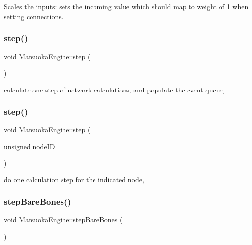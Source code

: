 Scales the inputs\+: sets the incoming value which should map to weight of 1 when setting connections. 

\mbox{\label{classMatsuokaEngine_a4fa468dc0814f1ad92594f7a4d5abd00}} 
\subsubsection{\texorpdfstring{step()}{step()}\hspace{0.1cm}{\footnotesize\ttfamily [1/2]}}
{\footnotesize\ttfamily void Matsuoka\+Engine\+::step (\begin{DoxyParamCaption}{ }\end{DoxyParamCaption})}



calculate one step of network calculations, and populate the event queue, 

\mbox{\label{classMatsuokaEngine_aedf2583d11befa98a8a9d74c700635d6}} 
\subsubsection{\texorpdfstring{step()}{step()}\hspace{0.1cm}{\footnotesize\ttfamily [2/2]}}
{\footnotesize\ttfamily void Matsuoka\+Engine\+::step (\begin{DoxyParamCaption}\item[{unsigned}]{node\+ID }\end{DoxyParamCaption})}



do one calculation step for the indicated node, 

\mbox{\label{classMatsuokaEngine_a12519e69a1b16fe9c07717ded5249cdf}} 
\subsubsection{\texorpdfstring{step\+Bare\+Bones()}{stepBareBones()}}
{\footnotesize\ttfamily void Matsuoka\+Engine\+::step\+Bare\+Bones (\begin{DoxyParamCaption}{ }\end{DoxyParamCaption})}



